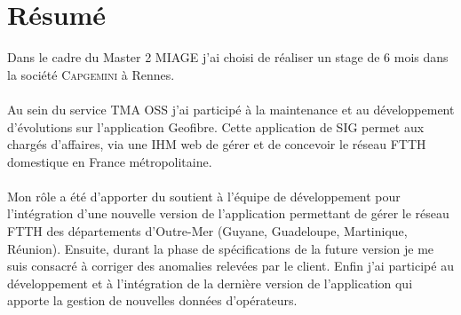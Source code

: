 \chapter*{Résumé}
Dans le cadre du Master 2 MIAGE j'ai choisi de réaliser un stage de 6 mois dans la société \textsc{Capgemini} à Rennes.
\\\\
Au sein du service TMA OSS j'ai participé à la maintenance et au développement d'évolutions sur l'application Geofibre.
Cette application de SIG permet aux chargés d'affaires, via une IHM web de gérer et de concevoir le réseau FTTH domestique en France métropolitaine.
\\\\
Mon rôle a été d'apporter du soutient à l'équipe de développement pour l'intégration d'une nouvelle version de l'application
permettant de gérer le réseau FTTH des départements d'Outre-Mer (Guyane, Guadeloupe, Martinique, Réunion).
Ensuite, durant la phase de spécifications de la future version je me suis consacré à corriger des anomalies relevées par le client.
Enfin j'ai participé au développement et à l'intégration de la dernière version de l'application qui apporte la gestion de nouvelles données d'opérateurs.
